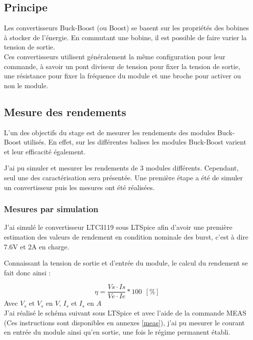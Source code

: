 \subsection{Principe}
Les convertisseurs Buck-Boost (ou Boost) se basent sur les propriétés des bobines à stocker de l'énergie. En commutant une bobine, il est possible de faire varier la tension de sortie.\\
Ces convertisseurs utilisent généralement la même configuration pour leur commande, à savoir un pont diviseur de tension pour fixer la tension de sortie, une résistance pour fixer la fréquence du module et une broche pour activer ou non le module.

\subsection{Mesure des rendements}

L'un des objectifs du stage est de mesurer les rendements des modules Buck-Boost utilisés. En effet, sur les différentes balises les modules Buck-Boost varient et leur efficacité également. 

J'ai pu simuler et mesurer les rendements de 3 modules différents. Cependant, seul une des caractérisation sera présentée. Une première étape a été de simuler un convertisseur puis les mesures ont été réalisées.

\subsubsection{Mesures par simulation}

J'ai simulé le convertisseur LTC3119 sous LTSpice afin d'avoir une première estimation des valeurs de rendement en condition nominale des burst, c'est à dire 7.6V et 2A en charge.

Connaissant la tension de sortie et d'entrée du module, le calcul du rendement se fait donc ainsi : 

$$ \eta = \frac{Vs \cdot Is}{Ve \cdot Ie} *100 ~~[\%]$$
Avec $V_s$ et $V_s$ en $V$, $I_s$ et $I_s$ en $A$ \\

J'ai réalisé le schéma suivant  sous LTSpice et avec l'aide de la commande MEAS (Ces instructions sont disponibles en annexes \ref{meas}), j'ai pu mesurer le courant en entrée du module ainsi qu'en sortie, une fois le régime permanent établi.




